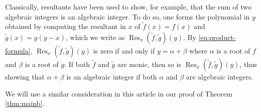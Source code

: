 \documentclass[11pt,reqno]{amsart}
\theoremstyle{remark}
\DeclareMathOperator{\Res}{Res}
\begin{document}
Classically, resultants have been used to show, for example, that the sum of two algebraic integers
is an algebraic integer.  To do so, one forms the polynomial in $y$ obtained by computing
the resultant in $x$ of $\tilde{f}(x) = f(x)$ and $\tilde{g}(x) = g(y-x)$, which we write
as $\Res_{x}(\tilde{f},\tilde{g})(y)$.  By \eqref{eq:product-formula}, $\Res_{x}(\tilde{f},\tilde{g})(y)$
is zero if and only if $y = \alpha + \beta$ where $\alpha $ is a root of $f$ and $\beta$ is
a root of $g$.  If both $\tilde{f}$ and $\tilde{g}$ are monic, then so is $\Res_{x}(\tilde{f},\tilde{g})(y)$,
thus showing that $\alpha + \beta$ is an algebraic integer if both $\alpha$ and $\beta$ are algebraic integers.

We will use a similar consideration in this article in our proof of Theorem \ref{thm:mainb}.
\end{document}

